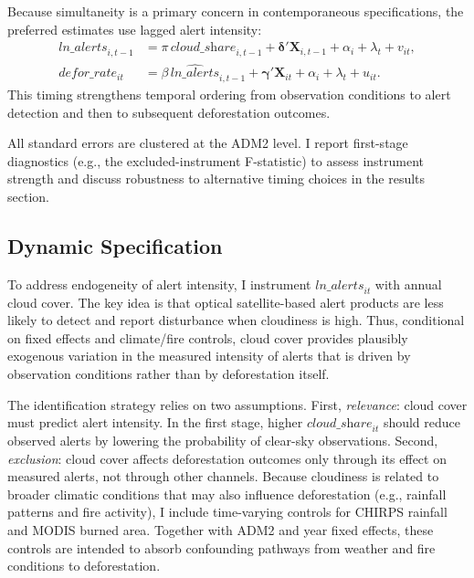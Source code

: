\documentclass[hidelinks,12pt]{article}
\begin{document}
Because simultaneity is a primary concern in contemporaneous specifications, the preferred estimates use lagged alert intensity:
\begin{align}
\label{eq:first_stage_lag}
  \textit{ln\_alerts}_{i,t-1}
  &= \pi\,\textit{cloud\_share}_{i,t-1} + \boldsymbol{\delta}'\mathbf{X}_{i,t-1} + \alpha_i + \lambda_t + v_{it}, \\
\label{eq:second_stage_lag}
  defor\_rate_{it}
  &= \beta\,\widehat{\textit{ln\_alerts}}_{i,t-1} + \boldsymbol{\gamma}'\mathbf{X}_{it} + \alpha_i + \lambda_t + u_{it}.
\end{align}
This timing strengthens temporal ordering from observation conditions to alert detection and then to subsequent deforestation outcomes.

All standard errors are clustered at the ADM2 level. I report first-stage diagnostics (e.g., the excluded-instrument F-statistic) to assess instrument strength and discuss robustness to alternative timing choices in the results section.


\subsection{Dynamic Specification}
\label{sec:dynamic}

To address endogeneity of alert intensity, I instrument $\textit{ln\_alerts}_{it}$ with annual cloud cover. The key idea is that optical satellite-based alert products are less likely to detect and report disturbance when cloudiness is high. Thus, conditional on fixed effects and climate/fire controls, cloud cover provides plausibly exogenous variation in the measured intensity of alerts that is driven by observation conditions rather than by deforestation itself.

The identification strategy relies on two assumptions. First, \emph{relevance}: cloud cover must predict alert intensity. In the first stage, higher $\textit{cloud\_share}_{it}$ should reduce observed alerts by lowering the probability of clear-sky observations. Second, \emph{exclusion}: cloud cover affects deforestation outcomes only through its effect on measured alerts, not through other channels. Because cloudiness is related to broader climatic conditions that may also influence deforestation (e.g., rainfall patterns and fire activity), I include time-varying controls for CHIRPS rainfall and MODIS burned area. Together with ADM2 and year fixed effects, these controls are intended to absorb confounding pathways from weather and fire conditions to deforestation.
\end{document}
